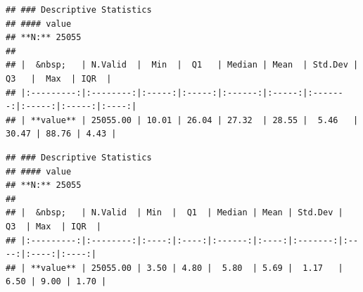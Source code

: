 \documentclass[
]{article}
\newenvironment{Shaded}{\begin{snugshade}}{\end{snugshade}}
\newcommand{\AttributeTok}[1]{\textcolor[rgb]{0.13,0.29,0.53}{#1}}
\newcommand{\ConstantTok}[1]{\textcolor[rgb]{0.56,0.35,0.01}{#1}}
\newcommand{\FunctionTok}[1]{\textcolor[rgb]{0.13,0.29,0.53}{\textbf{#1}}}
\newcommand{\NormalTok}[1]{#1}
\newcommand{\SpecialCharTok}[1]{\textcolor[rgb]{0.81,0.36,0.00}{\textbf{#1}}}
\newcommand{\StringTok}[1]{\textcolor[rgb]{0.31,0.60,0.02}{#1}}
\begin{document}
\begin{verbatim}
## ### Descriptive Statistics  
## #### value  
## **N:** 25055  
## 
## |  &nbsp;   | N.Valid  |  Min  |  Q1   | Median | Mean  | Std.Dev |  Q3   |  Max  | IQR  |
## |:---------:|:--------:|:-----:|:-----:|:------:|:-----:|:-------:|:-----:|:-----:|:----:|
## | **value** | 25055.00 | 10.01 | 26.04 | 27.32  | 28.55 |  5.46   | 30.47 | 88.76 | 4.43 |
\end{verbatim}

\begin{Shaded}
\end{Shaded}

\begin{verbatim}
## ### Descriptive Statistics  
## #### value  
## **N:** 25055  
## 
## |  &nbsp;   | N.Valid  | Min  |  Q1  | Median | Mean | Std.Dev |  Q3  | Max  | IQR  |
## |:---------:|:--------:|:----:|:----:|:------:|:----:|:-------:|:----:|:----:|:----:|
## | **value** | 25055.00 | 3.50 | 4.80 |  5.80  | 5.69 |  1.17   | 6.50 | 9.00 | 1.70 |
\end{verbatim}

\begin{Shaded}
\end{Shaded}
\end{document}
